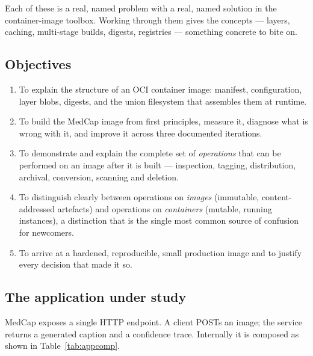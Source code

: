 \documentclass[10pt,a4paper]{article}
\begin{document}
Each of these is a real, named problem with a real, named solution in
the container-image toolbox. Working through them gives the concepts ---
layers, caching, multi-stage builds, digests, registries --- something
concrete to bite on.

\subsection{Objectives}

\begin{enumerate}[leftmargin=1.6em,itemsep=2pt]
  \item To explain the structure of an OCI container image: manifest,
        configuration, layer blobs, digests, and the union filesystem
        that assembles them at runtime.
  \item To build the MedCap image from first principles, measure it,
        diagnose what is wrong with it, and improve it across three
        documented iterations.
  \item To demonstrate and explain the complete set of \emph{operations}
        that can be performed on an image after it is built ---
        inspection, tagging, distribution, archival, conversion,
        scanning and deletion.
  \item To distinguish clearly between operations on \emph{images}
        (immutable, content-addressed artefacts) and operations on
        \emph{containers} (mutable, running instances), a distinction
        that is the single most common source of confusion for
        newcomers.
  \item To arrive at a hardened, reproducible, small production image
        and to justify every decision that made it so.
\end{enumerate}

\subsection{The application under study}

MedCap exposes a single HTTP endpoint. A client POSTs an image; the
service returns a generated caption and a confidence trace. Internally
it is composed as shown in Table~\ref{tab:appcomp}.
\end{document}
